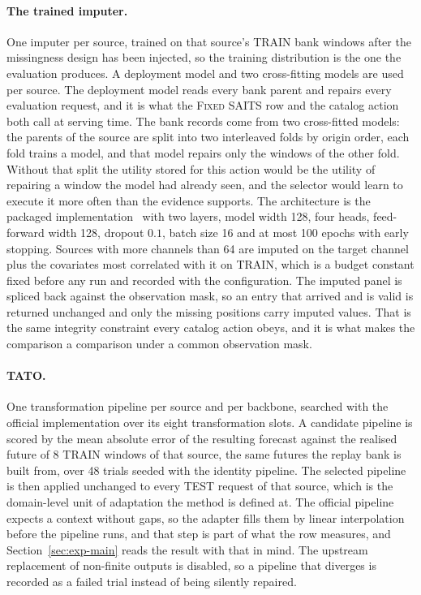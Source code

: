\documentclass{article}
\begin{document}
\paragraph{The trained imputer.} One imputer per source, trained on that source's TRAIN bank
windows after the missingness design has been injected, so the training distribution is the
one the evaluation produces. A deployment model and two cross-fitting models are used per source. The deployment model reads every
bank parent and repairs every evaluation request, and it is what the \textsc{Fixed SAITS} row
and the catalog action both call at serving time. The bank records come from two cross-fitted models: the parents of the source are split into two interleaved folds by origin order, each fold trains a model, and
that model repairs only the windows of the other fold. Without that split the utility stored
for this action would be the utility of repairing a window the model had already seen, and the
selector would learn to execute it more often than the evidence supports. The architecture is the packaged implementation~\citep{du2023pypots} with
two layers, model width 128, four heads, feed-forward width 128, dropout $0.1$, batch size 16
and at most 100 epochs with early stopping. Sources with more channels than
64 are imputed on the target channel plus the covariates most correlated with it
on TRAIN, which is a budget constant fixed before any run and recorded with the configuration.
The imputed panel is spliced back against the observation mask, so an entry that arrived and is
valid is returned unchanged and only the missing positions carry imputed values. That is the
same integrity constraint every catalog action obeys, and it is what makes the comparison a
comparison under a common observation mask.

\paragraph{TATO.} One transformation pipeline per source and per backbone, searched with the
official implementation over its eight transformation slots. A candidate pipeline is scored by
the mean absolute error of the resulting forecast against the realised future of
8 TRAIN windows of that source, the same futures the replay bank is built from,
over 48 trials seeded with the identity pipeline. The selected pipeline is then
applied unchanged to every TEST request of that source, which is the domain-level unit of
adaptation the method is defined at. The official pipeline expects a context without gaps, so
the adapter fills them by linear interpolation before the pipeline runs, and that step is
part of what the row measures, and Section~\ref{sec:exp-main} reads the result with that in
mind. The upstream replacement of non-finite outputs is disabled, so a pipeline that diverges
is recorded as a failed trial instead of being silently repaired.
\end{document}
